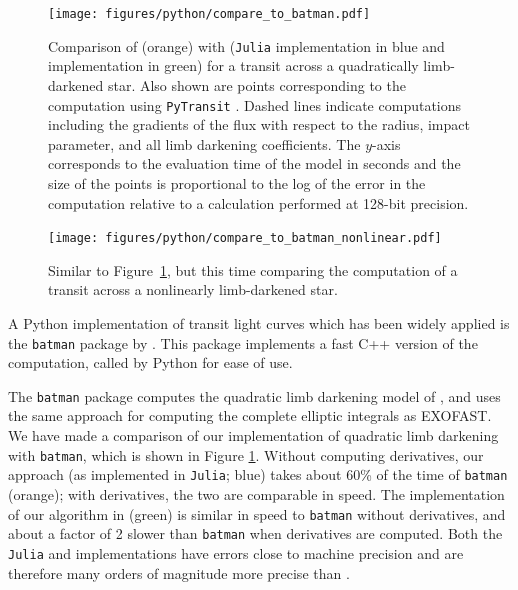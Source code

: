 \documentclass[modern]{aastex61}
\begin{document}
\begin{figure}[p!]
    \begin{centering}
    \texttt{[image: figures/python/compare\_to\_batman.pdf]}
    \caption{Comparison of \citet{Kreidberg2015} (orange) with \thiswork
             (\texttt{Julia} implementation in blue and \starry implementation
             in green) for a transit across a quadratically limb-darkened star.
             Also shown are points corresponding to the computation using
             \texttt{PyTransit} \citep{Parviainen2015b}. Dashed lines indicate
             computations including the gradients of the flux with respect to
             the radius, impact parameter, and all limb darkening coefficients.
             The $y$-axis corresponds to the evaluation time of the model in
             seconds and the size of the points is proportional to the log of
             the error in the computation relative to a calculation performed
             at 128-bit precision.
    \label{fig:batman_comparison}}
    \end{centering}
\end{figure}

\begin{figure}[p!]
    \begin{centering}
    \texttt{[image: figures/python/compare\_to\_batman\_nonlinear.pdf]}
    \caption{Similar to Figure~\ref{fig:batman_comparison}, but this time comparing
             the computation of a transit across a nonlinearly limb-darkened star.
    \label{fig:batman_nonlinear_comparison}}
    \end{centering}
\end{figure}

A Python implementation of transit light curves which has been widely applied
is the \texttt{batman} package by \citet{Kreidberg2015}.  This package
implements a fast C++ version of the computation, called by Python for
ease of use.

The \texttt{batman} package computes the quadratic limb darkening model
of \citet{MandelAgol2002}, and uses the same approach for computing
the complete elliptic integrals as EXOFAST.  We have made a comparison
of our implementation of quadratic limb darkening with \texttt{batman},
which is shown in Figure \ref{fig:batman_comparison}.  Without computing
derivatives, our approach (as implemented in \texttt{Julia}; blue)
takes about 60\% of the time of \texttt{batman} (orange);
with derivatives, the two are comparable in speed. The implementation
of our algorithm in \starry (green) is similar in speed to \texttt{batman}
without derivatives, and about a factor of 2 slower than \texttt{batman}
when derivatives are computed. Both the \texttt{Julia} and \starry
implementations have errors close to machine precision and are therefore
many orders of magnitude more precise than \batman.
\end{document}
